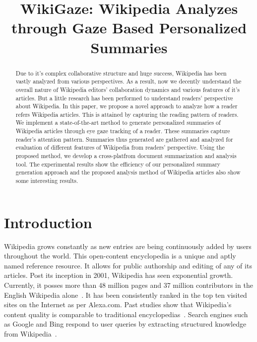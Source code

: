 \documentclass[12pt]{article}
\begin{document}
\title{WikiGaze: Wikipedia Analyzes through Gaze Based Personalized Summaries}
\maketitle

\begin{abstract}
  Due to it's complex collaborative structure and huge success, Wikipedia has been vastly analyzed from various perspectives. 
As a result, now we decently understand the overall nature of Wikipedia editors' collaboration dynamics and various features of it's articles. 
But a little research has been performed to understand readers' perspective about Wikipedia. 
In this paper, we propose a novel approach to analyze how a reader refers Wikipedia articles. 
This is attained by capturing the reading pattern of readers. 
We implement a state-of-the-art method to generate personalized summaries of Wikipedia articles through eye gaze tracking of a reader. 
These summaries capture reader's attention pattern. 
Summaries thus generated are gathered and analyzed for evaluation of different features of Wikipedia from readers' perspective. 
Using the proposed method, we develop a cross-platfrom document summarization and analysis tool. 
The experimental results show the efficiency of our personalized summary generation approach and the proposed analysis method of Wikipedia articles also show some interesting results.
\end{abstract}


\section{Introduction}
Wikipedia grows constantly as new entries are being continuously added by users throughout the world. This open-content encyclopedia is a unique and aptly named reference resource. It allows for public authorship and editing of any of its articles. Post its inception in 2001, Wikipedia has seen exponential growth. Currently, it posses more than 48 million pages and 37 million contributors in the English Wikipedia alone~\cite{wiki:Wikipedia:Statistics}. It has been consistently ranked in the top ten visited sites on the Internet as per Alexa.com. Past studies show that Wikipedia's content quality is comparable to traditional encyclopedias~\cite{giles2005internet}. Search engines such as Google and Bing respond to user queries by extracting structured knowledge from Wikipedia~\cite{bergstrom2009conversation}.
\end{document}
